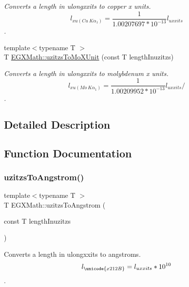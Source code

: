 \begin{DoxyCompactItemize}
\begin{DoxyCompactList}\small\item\em Converts a length in ulongxxits to copper x units. \[ l_{xu(Cu\ K\alpha_1)}= \frac{1}{1.00207697*10^{-13}} l_{uxxits} \]. \end{DoxyCompactList}\item 
{\footnotesize template$<$typename T $>$ }\\T \mbox{\hyperlink{group___e_g_x_math-_conversions-_length_conversions-uzitzs-_non-_s_i_ga64b556911b0bb06cf315aa02f5e2d379}{E\+G\+X\+Math\+::uzitzs\+To\+Mo\+X\+Unit}} (const T length\+Inuzitzs)
\begin{DoxyCompactList}\small\item\em Converts a length in ulongxxits to molybdenum x units. \[ l_{xu(Mo\ K\alpha_1)}=\frac{1}{1.00209952*10^{-13}} l_{uxxits} / \]. \end{DoxyCompactList}\end{DoxyCompactItemize}


\subsection{Detailed Description}


\subsection{Function Documentation}
\mbox{\label{group___e_g_x_math-_conversions-_length_conversions-uzitzs-_non-_s_i_gaaaecee65b1db5abcc71e18526e7073eb}} 
\subsubsection{\texorpdfstring{uzitzs\+To\+Angstrom()}{uzitzsToAngstrom()}}
{\footnotesize\ttfamily template$<$typename T $>$ \\
T E\+G\+X\+Math\+::uzitzs\+To\+Angstrom (\begin{DoxyParamCaption}\item[{const T}]{length\+Inuzitzs }\end{DoxyParamCaption})}



Converts a length in ulongxxits to angstroms. \[ l_{\unicode{x212B}}=l_{uxxits} * 10^{10} \]. 

